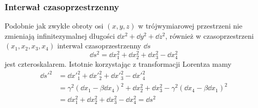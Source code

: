 \documentclass[../main.tex]{subfiles}
\begin{document}
\subsubsection{Interwał czasoprzestrzenny}
Podobnie jak zwykłe obroty osi \((x,y,z)\) w trójwymiarowej przestrzeni nie zmieniają infinitezymalnej długości \(\dd{x}^2+\dd{y}^2+\dd{z}^2\), również w czasoprzestrzeni \((x_1,x_2,x_3,x_4)\) interwał czasoprzestrzenny \(\dd{s}\)
\begin{equation*}
    \dd{s}^2=\dd{x}_1^2+\dd{x}_2^2+\dd{x}_3^2-\dd{x}_4^2
\end{equation*}
jest czteroskalarem. Istotnie korzystając z transformacji Lorentza mamy
\begin{equation*}
\begin{split}
    \dd{s'}^2&=\dd{x'}_1^2+\dd{x'}_2^2+\dd{x'}_3^2-\dd{x'}_4^2\\
    &=\gamma^2(\dd{x}_1-\beta\dd{x}_4)^2+\dd{x}_2^2+\dd{x}_3^2-\gamma^2(\dd{x}_4-\beta\dd{x}_1)^2\\
    &=\dd{x}_1^2+\dd{x}_2^2+\dd{x}_3^2-\dd{x}_4^2=\dd{s}^2
\end{split}
\end{equation*}
\end{document}
